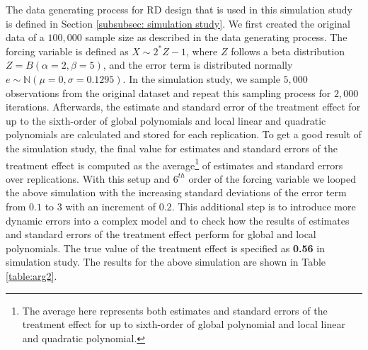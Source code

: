 \documentclass[fleqn]{article}
\begin{document}
    The data generating process for RD design that is used in this simulation study is defined in Section \ref{subsubsec: simulation study}. We first created the original data of a $100,000$ sample size as described in the data generating process. The forcing variable is defined as $X \sim 2^{*}Z - 1$, where $Z$ follows a beta distribution $Z = B(\alpha = 2, \beta = 5)$, and the error term is distributed normally $e \sim \mathbb{N}(\mu = 0, \sigma = 0.1295)$. In the simulation study, we sample $5,000$ observations from the original dataset and repeat this sampling process for $2,000$ iterations. Afterwards, the estimate and standard error of the treatment effect for up to the sixth-order of global polynomials and local linear and quadratic polynomials are calculated and stored for each replication. To get a  good result of the simulation study, the final value for estimates and standard errors of the treatment effect is computed as the average\footnote{The average here represents both estimates and standard errors of the treatment effect for up to sixth-order of global polynomial and local linear and quadratic polynomial.} of estimates and standard errors over replications. With this setup and $6^{th}$ order of the forcing variable we looped the above simulation with the increasing standard deviations of the error term from $0.1$ to $3$ with an increment of $0.2$. This additional step is to introduce more dynamic errors into a complex model and to check how the results of estimates and standard errors of the treatment effect perform for global and local polynomials. The true value of the treatment effect is specified as \textbf{0.56} in simulation study. The results for the above simulation are shown in Table \ref{table:arg2}. \\
\end{document}
